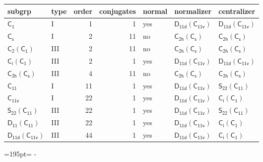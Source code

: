 \documentclass[10pt,a4paper]{article}
\newcommand{\needspace}[1]{\par\penalty-100\begingroup\dimen0=#1\relax\dimen2=\pagegoal
  \advance\dimen2-\pagetotal\ifdim\dimen0>\dimen2\relax\ifdim\dimen2>0pt\vfil\break\fi\fi
  \endgroup}
\numberwithin{equation}{section}
\newcommand{\grp}[1]{\mathsf{#1}}
\begin{document}
{\small\begin{longtable}{@{}llrrlll@{}}\toprule
subgrp & type & order & conjugates & normal & normalizer & centralizer\\\midrule\endhead
\bottomrule\endfoot\endlastfoot
\href{../../../rotation/data/pdf/C1.pdf}{$\grp{C_{1}}$} & I & 1 & 1 & yes & \href{D11d-C11v.pdf}{$\grp{D_{11d}}(\grp{C_{11v}})$} & \href{D11d-C11v.pdf}{$\grp{D_{11d}}(\grp{C_{11v}})$}\\*
\href{../../../rotation/data/pdf/C1v.pdf}{$\grp{C_{s}}$} & I & 2 & 11 & no & \href{C2h-C1v.pdf}{$\grp{C_{2h}}(\grp{C_{s}})$} & \href{C2h-C1v.pdf}{$\grp{C_{2h}}(\grp{C_{s}})$}\\*
\href{C2-C1.pdf}{$\grp{C_{2}}(\grp{C_{1}})$} & III & 2 & 11 & no & \href{C2h-C1v.pdf}{$\grp{C_{2h}}(\grp{C_{s}})$} & \href{C2h-C1v.pdf}{$\grp{C_{2h}}(\grp{C_{s}})$}\\*
\href{S2-C1.pdf}{$\grp{C_{i}}(\grp{C_{1}})$} & III & 2 & 1 & yes & \href{D11d-C11v.pdf}{$\grp{D_{11d}}(\grp{C_{11v}})$} & \href{D11d-C11v.pdf}{$\grp{D_{11d}}(\grp{C_{11v}})$}\\*
\href{C2h-C1v.pdf}{$\grp{C_{2h}}(\grp{C_{s}})$} & III & 4 & 11 & no & \href{C2h-C1v.pdf}{$\grp{C_{2h}}(\grp{C_{s}})$} & \href{C2h-C1v.pdf}{$\grp{C_{2h}}(\grp{C_{s}})$}\\*
\href{../../../rotation/data/pdf/C11.pdf}{$\grp{C_{11}}$} & I & 11 & 1 & yes & \href{D11d-C11v.pdf}{$\grp{D_{11d}}(\grp{C_{11v}})$} & \href{S22-C11.pdf}{$\grp{S_{22}}(\grp{C_{11}})$}\\*
\href{../../../rotation/data/pdf/C11v.pdf}{$\grp{C_{11v}}$} & I & 22 & 1 & yes & \href{D11d-C11v.pdf}{$\grp{D_{11d}}(\grp{C_{11v}})$} & \href{S2-C1.pdf}{$\grp{C_{i}}(\grp{C_{1}})$}\\*
\href{S22-C11.pdf}{$\grp{S_{22}}(\grp{C_{11}})$} & III & 22 & 1 & yes & \href{D11d-C11v.pdf}{$\grp{D_{11d}}(\grp{C_{11v}})$} & \href{S22-C11.pdf}{$\grp{S_{22}}(\grp{C_{11}})$}\\*
\href{D11-C11.pdf}{$\grp{D_{11}}(\grp{C_{11}})$} & III & 22 & 1 & yes & \href{D11d-C11v.pdf}{$\grp{D_{11d}}(\grp{C_{11v}})$} & \href{S2-C1.pdf}{$\grp{C_{i}}(\grp{C_{1}})$}\\*
\href{D11d-C11v.pdf}{$\grp{D_{11d}}(\grp{C_{11v}})$} & III & 44 & 1 & yes & \href{D11d-C11v.pdf}{$\grp{D_{11d}}(\grp{C_{11v}})$} & \href{S2-C1.pdf}{$\grp{C_{i}}(\grp{C_{1}})$}\\
\bottomrule\end{longtable}}
\needspace{195pt}
\end{document}
